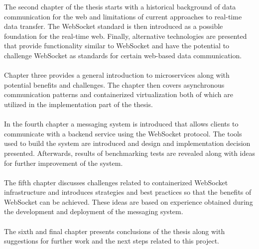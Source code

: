 The second chapter of the thesis starts with a historical background of data communication for the web and limitations of current approaches to real-time data transfer. The WebSocket standard is then introduced as a possible foundation for the real-time web. Finally, alternative technologies are presented that provide functionality similar to WebSocket and have the potential to challenge WebSocket as standards for certain web-based data communication.
\\ \\
Chapter three provides a general introduction to microservices along with potential benefits and challenges. The chapter then covers asynchronous communication patterns and containerized virtualization both of which are utilized in the implementation part of the thesis.
\\ \\
In the fourth chapter a messaging system is introduced that allows clients to communicate with a backend service using the WebSocket protocol. The tools used to build the system are introduced and design and implementation decision presented. Afterwards, results of benchmarking tests are revealed along with ideas for further improvement of the system.
\\ \\
The fifth chapter discusses challenges related to containerized WebSocket infrastructure and introduces strategies and best practices so that the benefits of WebSocket can be achieved. These ideas are based on experience obtained during the development and deployment of the messaging system.
\\ \\
The sixth and final chapter presents conclusions of the thesis along with suggestions for further work and the next steps related to this project.